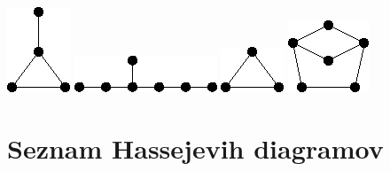 \documentclass[11pt,paper=b5,footinclude,headinclude]{scrbook} %
\begin{document}
\includegraphics[scale=0.5,frame]{smallGraphs/g_paw.png}     
\includegraphics[scale=0.5,frame]{smallGraphs/g_skewstar.png}     
\includegraphics[scale=0.5,frame]{smallGraphs/g_triangle.png}     
\includegraphics[scale=0.5,frame]{smallGraphs/g_twinC5.png}     


\chapter{Seznam Hassejevih diagramov}
\end{document}
